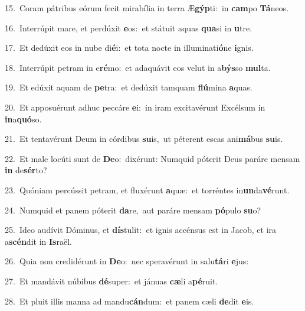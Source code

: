 {\numbfont\textcolor{\numbcolor}{15.}}~Coram pátribus eórum fecit mirabília in terra Æ\-\textbf{gýp}\-ti:~\star in \textbf{cam}\-po \textbf{Tá}\-neos.\par
{\numbfont\textcolor{\numbcolor}{16.}}~Interrúpit mare, et perdúxit \textbf{e}\-os:~\star et státuit aquas \textbf{qua}\-si in \textbf{u}\-tre.\par
{\numbfont\textcolor{\numbcolor}{17.}}~Et dedúxit eos in nube di\-\textbf{é}\-i:~\star et tota nocte in illuminati\-\textbf{ó}\-ne \textbf{i}\-gnis.\par
{\numbfont\textcolor{\numbcolor}{18.}}~Interrúpit petram in e\-\textbf{ré}\-mo:~\star et adaquávit eos velut in a\-\textbf{býs}\-so \textbf{mul}\-ta.\par
{\numbfont\textcolor{\numbcolor}{19.}}~Et edúxit aquam de \textbf{pe}\-tra:~\star et dedúxit tamquam \textbf{flú}\-mina \textbf{a}\-quas.\par
{\numbfont\textcolor{\numbcolor}{20.}}~Et apposuérunt adhuc peccáre \textbf{e}\-i:~\star in iram excitavérunt Excélsum in \textbf{in}\-a\-\textbf{quó}\-so.\par
{\numbfont\textcolor{\numbcolor}{21.}}~Et tentavérunt Deum in córdibus \textbf{su}\-is,~\star ut péterent escas ani\-\textbf{má}\-bus \textbf{su}\-is.\par
{\numbfont\textcolor{\numbcolor}{22.}}~Et male locúti sunt de \textbf{De}\-o:~\star dixérunt: Numquid póterit Deus paráre mensam \textbf{in} de\-\textbf{sér}\-to?\par
{\numbfont\textcolor{\numbcolor}{23.}}~Quóniam percússit petram, et fluxérunt \textbf{a}\-quæ:~\star et torréntes in\-\textbf{un}\-da\-\textbf{vé}\-runt.\par
{\numbfont\textcolor{\numbcolor}{24.}}~Numquid et panem póterit \textbf{da}\-re,~\star aut paráre mensam \textbf{pó}\-pulo \textbf{su}\-o?\par
{\numbfont\textcolor{\numbcolor}{25.}}~Ideo audívit Dóminus, et \textbf{dís}\-tulit:~\star et ignis accénsus est in Jacob, et ira a\-\textbf{scén}\-dit in \textbf{Is}\-raël.\par
{\numbfont\textcolor{\numbcolor}{26.}}~Quia non credidérunt in \textbf{De}\-o:~\star nec speravérunt in salu\-\textbf{tá}\-ri \textbf{e}\-jus:\par
{\numbfont\textcolor{\numbcolor}{27.}}~Et mandávit núbibus \textbf{dé}\-super:~\star et jánuas \textbf{cæ}\-li a\-\textbf{pé}\-ruit.\par
{\numbfont\textcolor{\numbcolor}{28.}}~Et pluit illis manna ad mandu\-\textbf{cán}\-dum:~\star et panem cæli \textbf{de}\-dit \textbf{e}\-is.\par
